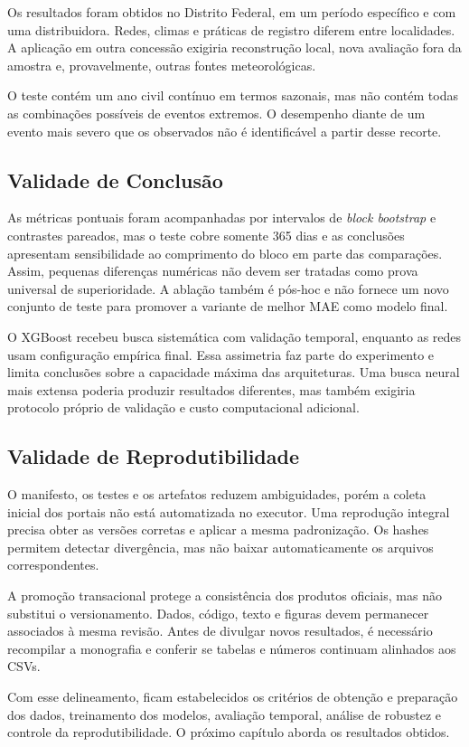 Os resultados foram obtidos no Distrito Federal, em um período específico e com uma distribuidora. Redes, climas e práticas de registro diferem entre localidades. A aplicação em outra concessão exigiria reconstrução local, nova avaliação fora da amostra e, provavelmente, outras fontes meteorológicas.

O teste contém um ano civil contínuo em termos sazonais, mas não contém todas as combinações possíveis de eventos extremos. O desempenho diante de um evento mais severo que os observados não é identificável a partir desse recorte.

\subsection{Validade de Conclusão}

As métricas pontuais foram acompanhadas por intervalos de \textit{block bootstrap} e contrastes pareados, mas o teste cobre somente 365 dias e as conclusões apresentam sensibilidade ao comprimento do bloco em parte das comparações. Assim, pequenas diferenças numéricas não devem ser tratadas como prova universal de superioridade. A ablação também é pós-hoc e não fornece um novo conjunto de teste para promover a variante de melhor MAE como modelo final.

O XGBoost recebeu busca sistemática com validação temporal, enquanto as redes usam configuração empírica final. Essa assimetria faz parte do experimento e limita conclusões sobre a capacidade máxima das arquiteturas. Uma busca neural mais extensa poderia produzir resultados diferentes, mas também exigiria protocolo próprio de validação e custo computacional adicional.

\subsection{Validade de Reprodutibilidade}

O manifesto, os testes e os artefatos reduzem ambiguidades, porém a coleta inicial dos portais não está automatizada no executor. Uma reprodução integral precisa obter as versões corretas e aplicar a mesma padronização. Os hashes permitem detectar divergência, mas não baixar automaticamente os arquivos correspondentes.

A promoção transacional protege a consistência dos produtos oficiais, mas não substitui o versionamento. Dados, código, texto e figuras devem permanecer associados à mesma revisão. Antes de divulgar novos resultados, é necessário recompilar a monografia e conferir se tabelas e números continuam alinhados aos CSVs.

Com esse delineamento, ficam estabelecidos os critérios de obtenção e preparação dos dados, treinamento dos modelos, avaliação temporal, análise de robustez e controle da reprodutibilidade. O próximo capítulo aborda os resultados obtidos.
